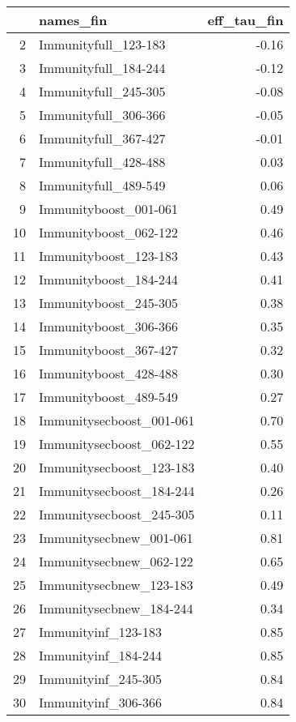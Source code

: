 \begin{table}[ht]
\centering
\begin{tabular}{rlr}
  \hline
 & names\_fin & eff\_tau\_fin \\ 
  \hline
2 & Immunityfull\_123-183 & -0.16 \\ 
  3 & Immunityfull\_184-244 & -0.12 \\ 
  4 & Immunityfull\_245-305 & -0.08 \\ 
  5 & Immunityfull\_306-366 & -0.05 \\ 
  6 & Immunityfull\_367-427 & -0.01 \\ 
  7 & Immunityfull\_428-488 & 0.03 \\ 
  8 & Immunityfull\_489-549 & 0.06 \\ 
  9 & Immunityboost\_001-061 & 0.49 \\ 
  10 & Immunityboost\_062-122 & 0.46 \\ 
  11 & Immunityboost\_123-183 & 0.43 \\ 
  12 & Immunityboost\_184-244 & 0.41 \\ 
  13 & Immunityboost\_245-305 & 0.38 \\ 
  14 & Immunityboost\_306-366 & 0.35 \\ 
  15 & Immunityboost\_367-427 & 0.32 \\ 
  16 & Immunityboost\_428-488 & 0.30 \\ 
  17 & Immunityboost\_489-549 & 0.27 \\ 
  18 & Immunitysecboost\_001-061 & 0.70 \\ 
  19 & Immunitysecboost\_062-122 & 0.55 \\ 
  20 & Immunitysecboost\_123-183 & 0.40 \\ 
  21 & Immunitysecboost\_184-244 & 0.26 \\ 
  22 & Immunitysecboost\_245-305 & 0.11 \\ 
  23 & Immunitysecbnew\_001-061 & 0.81 \\ 
  24 & Immunitysecbnew\_062-122 & 0.65 \\ 
  25 & Immunitysecbnew\_123-183 & 0.49 \\ 
  26 & Immunitysecbnew\_184-244 & 0.34 \\ 
  27 & Immunityinf\_123-183 & 0.85 \\ 
  28 & Immunityinf\_184-244 & 0.85 \\ 
  29 & Immunityinf\_245-305 & 0.84 \\ 
  30 & Immunityinf\_306-366 & 0.84 \\ 

\end{tabular}
\end{table}
